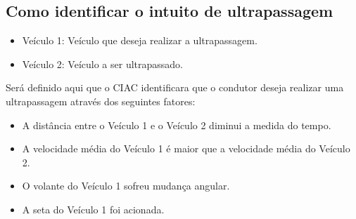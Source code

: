 \subsection{Como identificar o intuito de ultrapassagem}

\begin{itemize}
  \item Veículo 1: Veículo que deseja realizar a ultrapassagem.
  \item Veículo 2: Veículo a ser ultrapassado.
\end{itemize}

Será definido aqui que o CIAC identificara que o condutor deseja realizar uma ultrapassagem através dos seguintes fatores:

\begin{itemize}
  \item A distância entre o Veículo 1 e o Veículo 2 diminui a medida do tempo.
  \item A velocidade média do Veículo 1 é maior que a velocidade média do Veículo 2.
  \item O volante do Veículo 1 sofreu mudança angular.
  \item A seta do Veículo 1 foi acionada.
\end{itemize}
